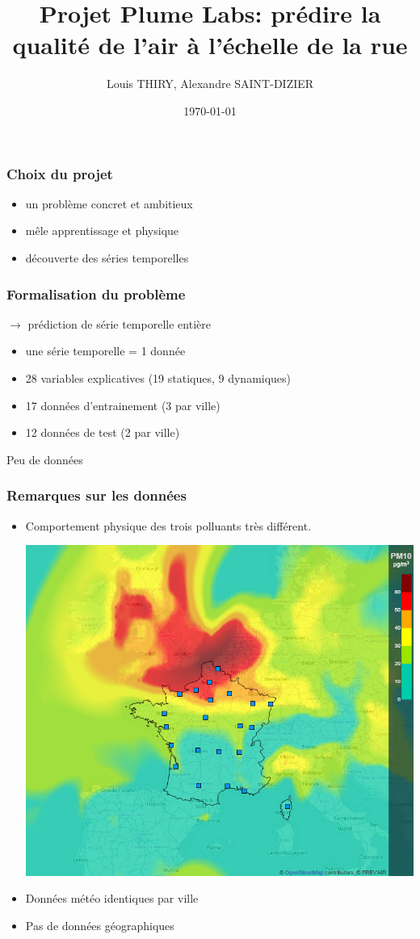\documentclass{beamer}
\title[Challenge Data ENS]{Projet Plume Labs: prédire la qualité de l'air à l'échelle de la rue}
\author{Louis THIRY, Alexandre SAINT-DIZIER}
\institute[MVA]
{ENS-Cachan}
\date{\today}
\begin{document}


\begin{frame}
\titlepage
\end{frame}



\begin{frame}
\frametitle{Choix du projet}
\begin{itemize}
  \item un problème concret et ambitieux
  \item mêle apprentissage et physique
  \item découverte des séries temporelles
\end{itemize}
\end{frame}

\begin{frame}
  \frametitle{Formalisation du problème}
  $\rightarrow$ prédiction de série temporelle entière
  \begin{itemize}
    \item une série temporelle = 1 donnée
    \item 28 variables explicatives (19 statiques, 9 dynamiques)
    \item 17 données d'entrainement (3 par ville)
    \item 12 données de test (2 par ville)
  \end{itemize}
  Peu de données
\end{frame}

\begin{frame}
\frametitle{Remarques sur les données}
\begin{itemize}
  \item Comportement physique des trois polluants très différent.
  	\begin{center}
  		\includegraphics[width = 0.5\linewidth]{images/francepm10.jpg}
  	\end{center}
  \item Données météo identiques par ville
  \item Pas de données géographiques
\end{itemize}
\end{frame}
\end{document}

